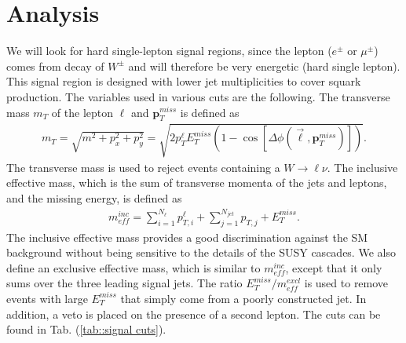 \documentclass[11pt]{article}
\begin{document}
\section*{Analysis}
\begin{flushleft}
We will look for hard single-lepton signal regions, since the lepton ($e^{\pm}$ or $\mu^{\pm}$) comes from decay of $W^{\pm}$ and will therefore be very energetic (hard single lepton). This signal region is designed with lower jet multiplicities to cover squark production. The variables used in various cuts are the following. The transverse mass $m_T$ of the lepton $\ell$ and $\textbf{p}_T^{miss}$ is defined as
\begin{align*}
m_T = \sqrt{m^2 + p_x^2 + p_y^2}= \sqrt{2p_T^{\ell}E_T^{miss}(1- \cos [\Delta \phi(\vec{\ell}, \textbf{p}^{miss}_T)])}.
\end{align*}
The transverse mass is used to reject events containing a $W \rightarrow \ell \nu$. The inclusive effective mass, which is the sum of transverse momenta of the jets and leptons, and the missing energy, is defined as
\begin{align*}
m_{eff}^{inc} = \sum_{i=1}^{N_{\ell}} p^{\ell}_{T,i} + \sum^{N_{jet}}_{j=1} p_{T,j} + E_T^{miss}.
\end{align*}
The inclusive effective mass provides a good discrimination against the SM background without being sensitive to the details of the SUSY cascades. We also define an exclusive effective mass, which is similar to $m_{eff}^{inc}$, except that it only sums over the three leading signal jets. The ratio $E_T^{miss}/m_{eff}^{excl}$ is used to remove events with large $E_T^{miss}$ that simply come from a poorly constructed jet. In addition, a veto is placed on the presence of a second lepton. The cuts can be found in Tab. (\ref{tab::signal cuts}).
\end{flushleft}
\end{document}
